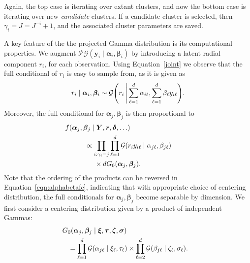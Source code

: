 Again, the top case is iterating over extant clusters, and now the bottom case is iterating 
    over new \emph{candidate} clusters.  If a candidate cluster is selected,
    then $\gamma_i = J = J^{- i} + 1$, and the associated cluster parameters are saved.

A key feature of the the projected Gamma distribution is its computational properties. We augment 
$\mathcal{PG}(\bm{y}_i\mid\bm{\alpha}_i,\bm{\beta}_i) $ by introducing a latent radial component $r_i$, 
for each observation. Using Equation~\eqref{joint} we observe that the 
full conditional of $r_i$ is easy to sample from, as it is given as
\begin{equation}
    r_i\mid\bm{\alpha}_i,\bm{\beta}_i \sim \mathcal{G}\left(r_i \bigmid \sum_{\ell = 1}^d\alpha_{i\ell}, \sum_{\ell = 1}^d\beta_{\ell} y_{i\ell}\right).
\end{equation}
Moreover,  the full conditional for $\bm{\alpha}_j,\bm{\beta}_j$ is then proportional to
\begin{equation}
    \label{eqn:alphabetafc}
    \begin{aligned}
    &\hspace{-1cm}f(\bm{\alpha}_j,\bm{\beta}_j\mid \bm{Y},\bm{r},\bm{\delta},\ldots) \\
    &\propto \prod_{i:\gamma_i = j}\prod_{\ell = 1}^d\mathcal{G}\left(r_iy_{i\ell}\mid\alpha_{j\ell},\beta_{j\ell}\right) \\
    &\hspace{0.5cm} \times dG_0(\bm{\alpha}_j,\bm{\beta}_j).
    \end{aligned}
\end{equation}
Note that the ordering of the products can be reversed in Equation~\eqref{eqn:alphabetafc}, 
indicating that with appropriate choice of centering distribution, the full conditionals 
for $\bm{\alpha}_j,\bm{\beta}_j$ become separable by dimension.
We first consider a centering distribution given by a product of independent Gammas:
\begin{equation}
    \begin{aligned}
    &\hspace{-0.3cm}G_0(\bm{\alpha}_j,\bm{\beta}_j\mid \bm{\xi},\bm{\tau},\bm{\zeta},\bm{\sigma}) \\
    &= \prod_{\ell = 1}^d\mathcal{G}(\alpha_{j\ell}\mid \xi_{\ell},\tau_{\ell})\times\prod_{\ell = 2}^d\mathcal{G}(\beta_{j\ell}\mid\zeta_{\ell},\sigma_{\ell}).
    \end{aligned}
\end{equation}
